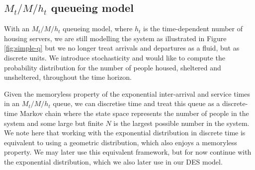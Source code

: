 \documentclass[12pt,a4paper]{article}
\begin{document}
\subsection{$M_t/M/h_t$ queueing model}
%
With an $M_t/M/h_t$ queueing model, where $h_t$ is the time-dependent number of housing servers, we are still modelling the system as illustrated in Figure \ref{fig:simple-q} but we no longer treat arrivals and departures as a fluid, but as discrete units. We introduce stochasticity and would like to compute the probability distribution for the number of people housed, sheltered and unsheltered, throughout the time horizon. 

Given the memoryless property of the exponential inter-arrival and service times in an $M_t/M/h_t$ queue, we can discretise time and treat this queue as a discrete-time Markov chain where the state space represents the number of people in the system and some large but finite $N$ is the largest possible number in the system. We note here that working with the exponential distribution in discrete time is equivalent to using a geometric distribution, which also enjoys a memoryless property. We may later use this equivalent framework, but for now continue with the exponential distribution, which we also later use in our DES model.
\end{document}
